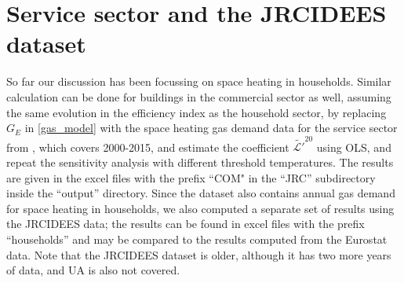 \documentclass[12pt]{article}
\begin{document}
\section{Service sector and the JRCIDEES dataset}
So far our discussion has been focussing on space heating in households. Similar calculation can be done for buildings in the commercial sector as well, assuming the same evolution in the efficiency index as the household sector, by replacing $G_E$ in \eqref{gas_model} with the space heating gas demand data for the service sector from \cite{JRC}, which covers 2000-2015, and estimate the coefficient $\tilde{\mathcal{L}'}^{20}$ using OLS, and repeat the sensitivity analysis with different threshold temperatures. The results are given in the excel files with the prefix ``COM" in the ``JRC'' subdirectory inside the ``output'' directory. Since the dataset also contains annual gas demand for space heating in households, we also computed a separate set of results using the JRCIDEES data; the results can be found in excel files with the prefix ``households'' and may be compared to the results computed from the Eurostat data. Note that the JRCIDEES dataset is older, although it has two more years of data, and UA is also not covered. 

 
\newpage


  



 
\end{document}

